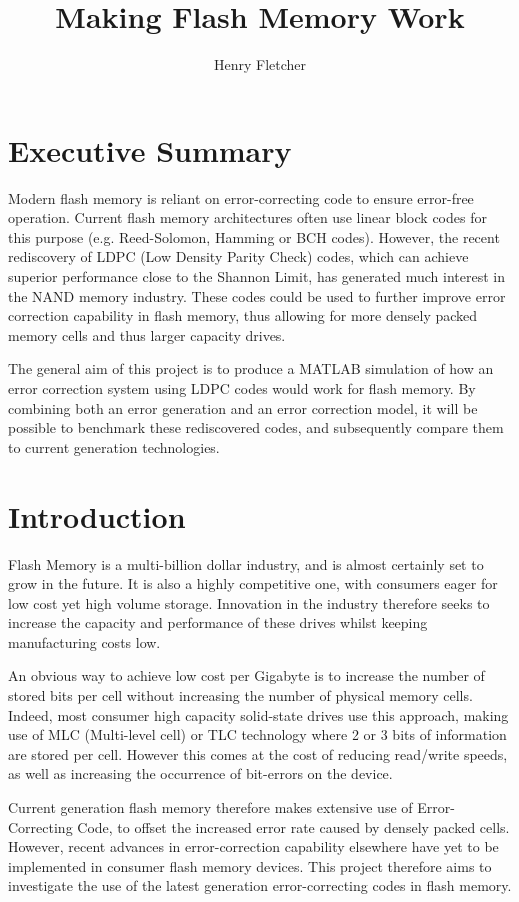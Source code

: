 \documentclass[11pt]{article}
\author{Henry Fletcher}
\title{Making Flash Memory Work}
\numberwithin{equation}{subsection}
\begin{document}
\section{Executive Summary}

Modern flash memory is reliant on error-correcting code to ensure error-free operation. Current flash memory architectures often use linear block codes for this purpose (e.g. Reed-Solomon, Hamming or BCH codes). However, the recent rediscovery of LDPC (Low Density Parity Check) codes, which can achieve superior performance close to the Shannon Limit, has generated much interest in the NAND memory industry. These codes could be used to further improve error correction capability in flash memory, thus allowing for more densely packed memory cells and thus larger capacity drives.

The general aim of this project is to produce a MATLAB simulation of how an error correction system using LDPC codes would work for flash memory.  By combining both an error generation and an error correction model, it will be possible to benchmark these rediscovered codes, and subsequently compare them to current generation technologies.

\tableofcontents

\section{Introduction}
Flash Memory is a multi-billion dollar industry, and is almost certainly set to grow in the future. It is also a highly competitive one, with consumers eager for low cost yet high volume storage. Innovation in the industry therefore seeks to increase the capacity and performance of these drives whilst keeping manufacturing costs low. 

An obvious way to achieve low cost per Gigabyte is to increase the number of stored bits per cell without increasing the number of physical memory cells. Indeed, most consumer high capacity solid-state drives use this approach, making use of MLC (Multi-level cell) or TLC technology where 2 or 3 bits of information are stored per cell. However this comes at the cost of reducing read/write speeds, as well as increasing the occurrence of bit-errors on the device. 

Current generation flash memory therefore makes extensive use of Error-Correcting Code, to offset the increased error rate caused by densely packed cells. However, recent advances in error-correction capability elsewhere have yet to be implemented in consumer flash memory devices. This project therefore aims to investigate the use of the latest generation error-correcting codes in flash memory. 
\end{document}
